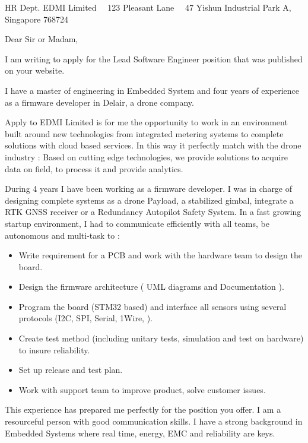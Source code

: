 \documentclass{scrlttr2}
\renewcommand{\\}{\ {\large\textperiodcentered}\ }
\begin{document}

\begin{letter}{ %
HR Dept. EDMI Limited\\
123 Pleasant Lane\\
47 Yishun Industrial Park A, \\
Singapore 768724
}


\opening{Dear Sir or Madam,}

I am writing to apply for the Lead Software Engineer position that was published on your website.

I have a master of engineering in Embedded System and four years of experience
as a firmware developer in Delair, a drone company.
	
Apply to EDMI Limited is
for me the opportunity to work in an environment built around new technologies from integrated metering systems to complete
solutions with cloud based services. 
In this way it perfectly match with
the drone industry : Based on cutting edge technologies, we provide
solutions to acquire data on field, to process it and provide analytics.

During 4 years I have been working as a firmware developer. I was in charge of
designing complete systems as a drone Payload, a stabilized gimbal, integrate a RTK
GNSS receiver or a Redundancy Autopilot Safety System. In a fast growing startup environment, I had to
communicate efficiently with all teams, be autonomous and multi-task to : 
\begin{itemize}
\item Write requirement for a PCB and work with the hardware team to design the board.
\item Design the firmware architecture ( UML diagrams and Documentation ).
\item Program the board (STM32 based) and interface all sensors using several protocols (I2C, SPI, Serial, 1Wire, ).
\item Create test method (including unitary tests, simulation and test on hardware) to insure reliability.
\item Set up release and test plan.
\item Work with support team to improve product, solve customer issues.
\end{itemize}
This experience has prepared me perfectly for the position you offer. I am a
	resourceful person with good communication skills. I have a strong
	background in Embedded Systems where real time, energy, EMC and reliability
	are keys. 


\end{letter}
\end{document}
